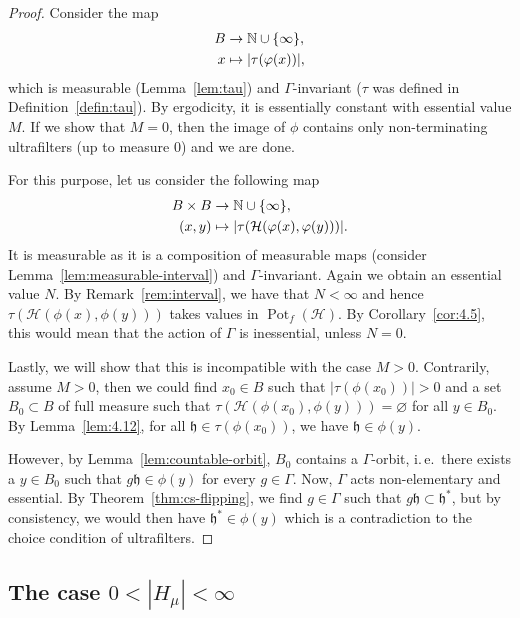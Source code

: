 \begin{proof}
  Consider the map
  \begin{align*}
    B & \to \mathbb{N} \cup \{\infty\},\\
    x & \mapsto |\tau(\varphi(x))|,
  \end{align*}
  which is measurable (Lemma~\ref{lem:tau}) and \(\Gamma\)-invariant (\(\tau\) was defined in Definition~\ref{defin:tau}). By ergodicity, it is essentially constant with essential value \(M\). If we show that \(M = 0\), then the image of \(\phi\) contains only non-terminating ultrafilters (up to measure 0) and we are done.

  For this purpose, let us consider the following map
  \begin{align*}
    B \times B & \to \mathbb{N} \cup \{\infty\},\\
    (x,y) & \mapsto |\tau(\mathcal{H}(\varphi(x), \varphi(y)))|.
  \end{align*}
  It is measurable as it is a composition of measurable maps (consider Lemma~\ref{lem:measurable-interval}) and \(\Gamma\)-invariant. Again we obtain an essential value \(N\). By Remark~\ref{rem:interval}, we have that \(N < \infty\) and hence \(\tau(\mathcal{H}(\phi(x), \phi(y)))\) takes values in \(\operatorname{Pot}_f(\mathcal{H})\). By Corollary~\ref{cor:4.5}, this would mean that the action of \(\Gamma\) is inessential, unless \(N = 0\).

  Lastly, we will show that this is incompatible with the case \(M > 0\). Contrarily, assume \(M > 0\), then we could find \(x_0 \in B\) such that \(|\tau(\phi(x_0))| > 0\) and a set \(B_0 \subset B\) of full measure such that \(\tau(\mathcal{H}(\phi(x_0), \phi(y))) = \varnothing\) for all \(y \in B_0\). By Lemma~\ref{lem:4.12}, for all \(\mathfrak{h} \in \tau(\phi(x_0))\), we have \(\mathfrak{h} \in \phi(y)\).

  However, by Lemma~\ref{lem:countable-orbit}, \(B_0\) contains a \(\Gamma\)-orbit, i.\,e.\ there exists a \(y \in B_0\) such that \(g\mathfrak{h} \in \phi(y)\) for every \(g \in \Gamma\). Now, \(\Gamma\) acts non-elementary and essential. By Theorem~\ref{thm:cs-flipping}, we find \(g \in \Gamma\) such that \(g\mathfrak{h} \subset \mathfrak{h}^\ast\), but by consistency, we would then have \(\mathfrak{h}^\ast \in \phi(y)\) which is a contradiction to the choice condition of ultrafilters.
\end{proof}

\subsection{The case \(0 < |H_\mu| < \infty\)}
\label{sec:N=finite}

